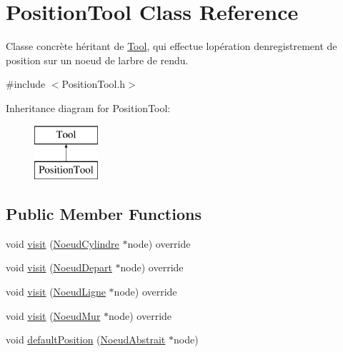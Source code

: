 \hypertarget{class_position_tool}{}\section{Position\+Tool Class Reference}
\label{class_position_tool}


Classe concrète héritant de \hyperlink{class_tool}{Tool}, qui effectue l\textquotesingle{}opération d\textquotesingle{}enregistrement de position sur un noeud de l\textquotesingle{}arbre de rendu.  




{\ttfamily \#include $<$Position\+Tool.\+h$>$}

Inheritance diagram for Position\+Tool\+:\begin{figure}[H]
\begin{center}
\leavevmode
\includegraphics[height=2.000000cm]{class_position_tool}
\end{center}
\end{figure}
\subsection*{Public Member Functions}
\begin{DoxyCompactItemize}
\item 
void \hyperlink{group__inf2990_gac1643483872455c76ef059ac67ae6d04}{visit} (\hyperlink{class_noeud_cylindre}{Noeud\+Cylindre} $\ast$node) override
\item 
void \hyperlink{group__inf2990_ga25f3c9e1decf3bf95d1e7491a2668565}{visit} (\hyperlink{class_noeud_depart}{Noeud\+Depart} $\ast$node) override
\item 
void \hyperlink{group__inf2990_ga7e8b178e97fab62523150d08d3195aef}{visit} (\hyperlink{class_noeud_ligne}{Noeud\+Ligne} $\ast$node) override
\item 
void \hyperlink{group__inf2990_gaf80e360d0e162b7075f5272e5860f60f}{visit} (\hyperlink{class_noeud_mur}{Noeud\+Mur} $\ast$node) override
\item 
void \hyperlink{group__inf2990_ga805981677e352dd98b018d04376bb6eb}{default\+Position} (\hyperlink{class_noeud_abstrait}{Noeud\+Abstrait} $\ast$node)
\end{DoxyCompactItemize}


